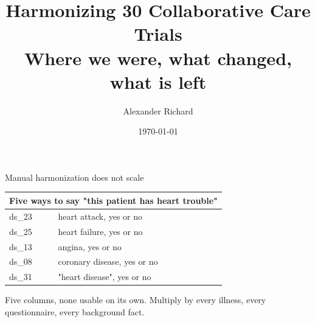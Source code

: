 \documentclass[11pt, t, handout]{beamer}
\title{Harmonizing 30 Collaborative Care Trials \\ \large Where we were, what changed, what is left}
\author{Alexander Richard}
\institute{DSSGx Munich, Collaborative Care IPD}
\date{\today}
\newcommand{\ans}[1]{\textcolor{structure.fg}{#1}}
\begin{document}
\begin{frame}\titlepage\end{frame}

% 

\begin{frame}{Manual harmonization does not scale}
  \pause
  \begin{center}\footnotesize
  \begin{tabular}{ll}
    \toprule
    \multicolumn{2}{l}{\textbf{Five ways to say "this patient has heart trouble"}} \\
    \midrule
    ds\_23 & heart attack, yes or no \\
    ds\_25 & heart failure, yes or no \\
    ds\_13 & angina, yes or no \\
    ds\_08 & coronary disease, yes or no \\
    ds\_31 & "heart disease", yes or no \\
    \bottomrule
  \end{tabular}
  \end{center}
  \vspace{12pt}
  \pause
  Five columns, \ans{none usable on its own}. Multiply by every illness, every
  questionnaire, every background fact.
\end{frame}
\end{document}
